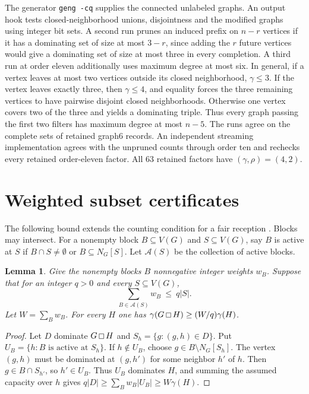 \documentclass[10pt]{article}
\newtheorem{lemma}[theorem]{Lemma}
\newcommand{\gp}{\mathbin{\vcenter{\hbox{\setlength{\fboxsep}{0pt}%
  \fbox{\rule{0pt}{.51em}\rule{.51em}{0pt}}}}}}
\begin{document}
The generator \texttt{geng -cq} supplies the connected unlabeled graphs.
An output hook tests closed-neighborhood unions, disjointness and the
modified graphs using integer bit sets. A second run prunes an induced
prefix on \(n-r\) vertices if it has a dominating set of size at most \(3-r\),
since adding the \(r\) future vertices would give a dominating set of size
at most three in every completion. A third run at order eleven additionally
uses maximum degree at most six. In general, if a vertex leaves at most two
vertices outside its closed neighborhood, \(\gamma\le3\). If the vertex
leaves exactly three, then \(\gamma\le4\), and equality forces the three
remaining vertices to have pairwise disjoint closed neighborhoods. Otherwise
one vertex covers two of the three and yields a dominating triple.
Thus every graph passing the first two filters has maximum degree at most
\(n-5\). The runs agree on the complete sets of retained graph6 records.
An independent streaming implementation agrees with the unpruned counts
through order ten and rechecks every retained order-eleven factor.
All 63 retained factors have \((\gamma,\rho)=(4,2)\).

\section{Weighted subset certificates}

The following bound extends the counting condition for a fair reception
\cite{reception}. Blocks may intersect. For a nonempty block \(B\subseteq V(G)\)
and \(S\subseteq V(G)\), say \(B\) is active at \(S\) if
\(B\cap S\ne\emptyset\) or \(B\subseteq N_G[S]\).
Let \(\mathcal A(S)\) be the collection of active blocks.

\begin{lemma}
Give the nonempty blocks \(B\) nonnegative integer weights \(w_B\).
Suppose that for an integer \(q>0\) and every \(S\subseteq V(G)\),
\[
    \sum_{B\in\mathcal A(S)}w_B \ \le\ q|S|.
\]
Let \(W=\sum_B w_B\). For every \(H\) one has
\(\gamma(G\gp H)\ge (W/q)\gamma(H)\).
\end{lemma}

\begin{proof}
Let \(D\) dominate \(G\gp H\) and \(S_h=\{g:(g,h)\in D\}\).
Put \(U_B=\{h:B\text{ is active at }S_h\}\).
If \(h\notin U_B\), choose \(g\in B\setminus N_G[S_h]\).
The vertex \((g,h)\) must be dominated at \((g,h')\) for some neighbor
\(h'\) of \(h\). Then \(g\in B\cap S_{h'}\), so \(h'\in U_B\).
Thus \(U_B\) dominates \(H\), and summing the assumed capacity over \(h\)
gives \(q|D|\ge\sum_B w_B|U_B|\ge W\gamma(H)\).
\end{proof}
\end{document}
